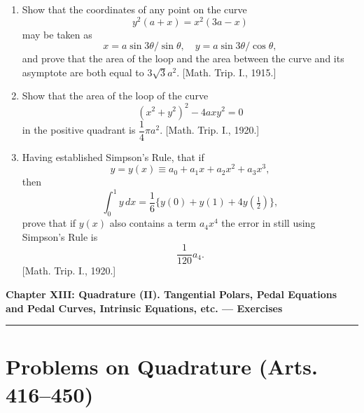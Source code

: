 \documentclass[11pt, a4paper]{article}
\newcommand{\source}[1]{\hfill\textnormal{[#1]}}
\begin{document}
\begin{enumerate}[leftmargin=2em]
\item Show that the coordinates of any point on the curve
\[
y^2(a+x)=x^2(3a-x)
\]
may be taken as
\[
x=a\sin3\theta/\sin\theta,\quad y=a\sin3\theta/\cos\theta,
\]
and prove that the area of the loop and the area between the curve and its asymptote are both equal to $3\sqrt3a^2$. \source{Math. Trip. I., 1915.}

\item Show that the area of the loop of the curve
\[
(x^2+y^2)^2-4axy^2=0
\]
in the positive quadrant is $\dfrac14\pi a^2$. \source{Math. Trip. I., 1920.}

\item Having established Simpson's Rule, that if
\[
y=y(x)\equiv a_0+a_1x+a_2x^2+a_3x^3,
\]
then
\[
\int_0^1 y\,dx=\frac16\{y(0)+y(1)+4y(\tfrac12)\},
\]
prove that if $y(x)$ also contains a term $a_4x^4$ the error in still using Simpson's Rule is
\[
\frac{1}{120}a_4.
\]
\source{Math. Trip. I., 1920.}

\end{enumerate}

\newpage

\begin{center}
    {\LARGE \bfseries \color{accent} Chapter XIII: Quadrature (II). Tangential Polars, Pedal Equations and Pedal Curves, Intrinsic Equations, etc. --- Exercises}\\
    \vspace{0.2cm}
    {\color{accent}\rule{0.55\linewidth}{0.8pt}}
\end{center}
\vspace{0.35cm}

\section*{Problems on Quadrature (Arts. 416--450)}
\end{document}
